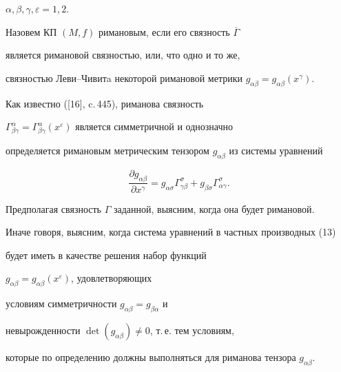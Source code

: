 $\alpha,\beta,\gamma,\varepsilon=1,2$.





\begin{defn}


Назовем КП $(M,f) $ римановым, если его связность $\overline{\Gamma} $


является римановой связностью, или, что одно и то же,


связностью Леви--Чивитa некоторой римановой метрики $g_{\alpha\beta}=


g_{\alpha\beta}(x^{\gamma})$.


\end{defn}





Как известно ([16], c.\,445), риманова связность


$\Gamma^{\alpha}_{\beta \gamma} =\Gamma^{\alpha}_{\beta


\gamma}(x^{\varepsilon})$ является симметричной и однозначно


определяется римановым метрическим тензором $g_{\alpha


\beta}$ из системы уравнений


\begin{equation}


\frac{\partial g_{\alpha \beta}}{\partial x^{\gamma}}


= g_{\alpha \sigma}\Gamma^{\sigma}_{ \gamma\beta }


+ g_{\beta \sigma}\Gamma^{\sigma}_{ \alpha\gamma}.


\end{equation}





Предполагая связность $\Gamma $ заданной, выясним, когда она будет римановой.


Иначе говоря, выясним, когда система уравнений в частных производных (13)


будет иметь в качестве решения набор функций


$ g_{\alpha \beta}= g_{\alpha \beta}(x^{\varepsilon})$, удовлетворяющих


условиям симметричности $ g_{\alpha \beta}= g_{\beta \alpha }$ и


невырожденности $\det (g_{\alpha \beta})\neq 0$, т.\,е. тем условиям,


которые по определению должны выполняться для риманова тензора $ g_{\alpha


\beta}$.





